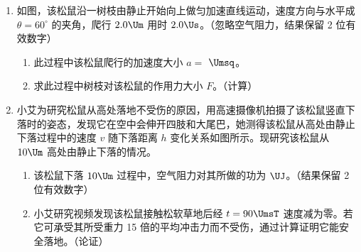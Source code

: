 \documentclass[\gkver]{gaokaozhenti}
\begin{document}
\begin{enumerate}
\begin{enumerate}
	\item
	如图，该松鼠沿一树枝由静止开始向上做匀加速直线运动，速度方向与水平成 $\theta=60^{\circ}$ 的夹角，爬行 $2.0 \Um$ 用时 $2.0 \Us$。（忽略空气阻力，结果保留 2 位有效数字）

	\onepicture[h=2.8cm, align=right]{}

	\begin{enumerate}
		\item
		此过程中该松鼠爬行的加速度大小 $a=$  $\Umsq$。

		\item
		求此过程中树枝对该松鼠的作用力大小 $F$。（计算）
	\end{enumerate}

	\item
	小艾为研究松鼠从高处落地不受伤的原因，用高速摄像机拍摄了该松鼠竖直下落时的姿态，发现它在空中会伸开四肢和大尾巴，她测得该松鼠从高处由静止下落过程中的速度 $v$ 随下落距离 $h$ 变化关系如图所示。现研究该松鼠从 $10 \Um$ 高处由静止下落的情况。

	\onepicture[w=6.0cm, align=right]{}

	\begin{enumerate}
		\item
		该松鼠下落 $10 \Um$ 过程中，空气阻力对其所做的功为  $\UJ$。（结果保留 2 位有效数字）

		\onepicture[h=2.8cm, align=right]{}

		\item
		小艾研究视频发现该松鼠接触松软草地后经 $t=90 \UmsT$ 速度减为零。若它可承受其所受重力 15 倍的平均冲击力而不受伤，通过计算证明它能安全落地。（论证）
	\end{enumerate}
\end{enumerate}
\end{enumerate}
\end{document}
